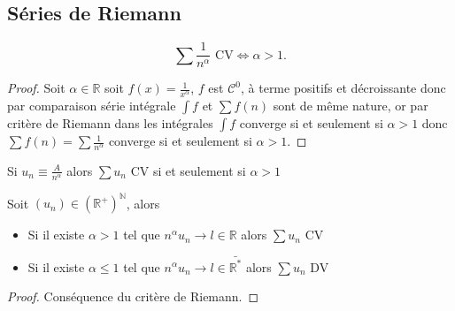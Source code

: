 \documentclass[11pt,colorlinks]{book}
\theoremstyle{mytheoremstyle}
\theoremstyle{mytheoremstyle}
\theoremstyle{mytheoremstyle}
\theoremstyle{mytheoremstyle}
\theoremstyle{mytheoremstyle}
\theoremstyle{mytheoremstyle}
\theoremstyle{mytheoremstyle}
\theoremstyle{mytheoremstyle}
\theoremstyle{myproblemstyle}
\def\mbb#1{\mathbb{#1}}
\def\bN{\mbb{N}}
\def\bR{\mbb{R}}
\def\mC{\mathcal{C}}
\def\rNp{\left(\bR^{+}\right)^{\bN}}
\begin{document}
\subsection{Séries de Riemann}
\begin{theorem}
  \begin{equation*}
    \sum \frac{1}{n^{\alpha}} \text{ CV} \Leftrightarrow \alpha > 1 \text{.}
  \end{equation*}
  \begin{proof}
    Soit $\alpha \in \bR$ soit $f(x) = \frac{1}{x^{\alpha}}$, $f$ est $\mC^0$, à terme positifs et décroissante 
    donc par comparaison série intégrale $\int f$ et $\sum f(n)$ sont de même nature, or par critère de Riemann dans les 
    intégrales $\int f$ converge si et seulement si $\alpha > 1$ donc $\sum f(n) = \sum \frac{1}{n^{\alpha}}$ converge si et 
    seulement si $\alpha > 1$.
  \end{proof}
\end{theorem}
\begin{rmq}
  Si $u_n \equiv \frac{A}{n^{\alpha}}$ alors $\sum u_n$ CV si et seulement si $\alpha > 1$ 
\end{rmq}
\begin{prop}
  Soit $(u_n) \in \rNp$, alors 
  \begin{itemize}
    \item Si il existe $\alpha > 1$ tel que $n^{\alpha}u_n \to l \in \bR$ alors $\sum u_n$ CV
    \item Si il existe $\alpha \leq 1$ tel que $n^{\alpha}u_n \to l \in \bar{\bR^{*}}$ alors $\sum u_n$ DV
  \end{itemize}
  \begin{proof}
    Conséquence du critère de Riemann.
  \end{proof}
\end{prop}
\end{document}
